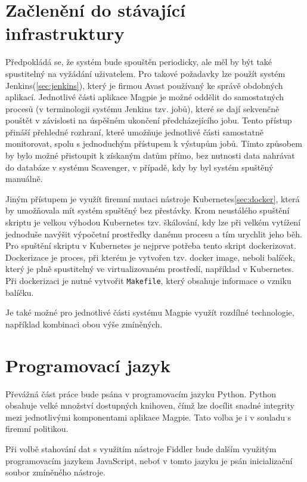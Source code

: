 \documentclass[thesis=M,czech,hidelinks]{FITthesis}[2013/05/06]
\begin{document}
\section{Začlenění do stávající infrastruktury}
Předpokládá se, že systém bude spouštěn periodicky, ale měl by být také spustitelný na vyžádání uživatelem. Pro takové požadavky lze použít systém Jenkins(\ref{sec:jenkins}), který je firmou Avast používaný ke správě obdobných aplikací. Jednotlivé části aplikace Magpie je možné oddělit do samostatných procesů (v terminologii systému Jenkins tzv. jobů), které se dají sekvenčně pouštět v závislosti na úspěšném ukončení předcházejícího jobu. Tento přístup přináší přehledné rozhraní, které umožňuje jednotlivé části samostatně monitorovat, spolu s jednoduchým přístupem k výstupům jobů. Tímto způsobem by bylo možné přistoupit k získaným datům přímo, bez nutnosti data nahrávat do databáze v systému Scavenger, v případě, kdy by byl systém spuštěný manuálně.

Jiným přístupem je využít firemní mutaci nástroje Kubernetes\ref{sec:docker}, která by umožňovala mít systém spuštěný bez přestávky. Krom neustálého spuštění skriptu je velkou výhodou Kubernetes tzv. škálování, kdy lze při velkém vytížení jednoduše navýšit výpočetní prostředky danému procesu a tím urychlit jeho běh. Pro spuštění skriptu v Kubernetes je nejprve potřeba tento skript dockerizovat. Dockerizace je proces, při kterém je vytvořen tzv. docker image, neboli balíček, který je plně spustitelný ve virtualizovaném prostředí, například v Kubernetes. Při dockerizaci je nutné vytvořit \texttt{Makefile}, který obsahuje informace o vzniku balíčku. 

Je také možné pro jednotlivé části systému Magpie využít rozdílné technologie, například kombinaci obou výše zmíněných.

\section{Programovací jazyk}
Převážná část práce bude psána v programovacím jazyku Python. Python obsahuje velké množství dostupných knihoven, čímž lze docílit snadné integrity mezi jednotlivými komponentami aplikace Magpie. Tato volba je i v souladu s firemní politikou. 

Při volbě stahování dat s využitím nástroje Fiddler bude dalším využitým programovacím jazykem JavaScript, neboť v tomto jazyku je psán inicializační soubor zmíněného nástroje.
\end{document}
